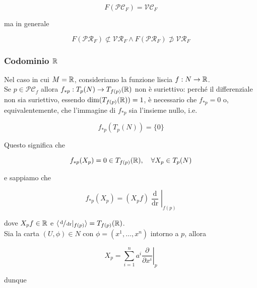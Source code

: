 \begin{remark}
	\begin{equation}
		F(\mathcal{PC}_{F}) = \mathcal{VC}_{F}
	\end{equation}

	ma in generale
	
	\begin{equation}
		F(\mathcal{PR}_{F}) \not\subset \mathcal{VR}_{F} \wedge F(\mathcal{PR}_{F}) \not\supset \mathcal{VR}_{F}
	\end{equation}
\end{remark}

\subsubsection{Codominio $ \mathbb{R} $}

Nel caso in cui $ M = \mathbb{R} $, consideriamo la funzione liscia $ f : N \to \mathbb{R} $.\\
Se $ p \in \mathcal{PC}_{f} $ allora $ f_{*p} : T_{p}(N) \to T_{f(p)}(\mathbb{R}) $ non è suriettivo: perché il differenziale non sia suriettivo, essendo $ \dim(T_{f(p)}(\mathbb{R})) = 1 $, è necessario che $ f_{*p} = 0 $ o, equivalentemente, che l'immagine di $ f_{*p} $ sia l'insieme nullo, i.e.

\begin{equation}
	f_{*p}(T_{p}(N)) = \{0\}
\end{equation}

Questo significa che

\begin{equation}
	f_{*p}(X_{p}) = 0 \in T_{f(p)}(\R) \qcomma \forall X_{p} \in T_{p}(N)
\end{equation}

e sappiamo che

\begin{equation}
	f_{*p}(X_{p}) = (X_{p} f) \left. \dfrac{\operatorname{d}}{\operatorname{dr}} \right|_{f(p)}
\end{equation}

dove $ X_{p} f \in \mathbb{R} $ e $ \langle \sfrac{\operatorname{d}}{\operatorname{dr}} |_{f(p)} \rangle = T_{f(p)}(\mathbb{R}) $.\\
Sia la carta $ (U,\phi) \in N $ con $ \phi = (x^{1},\dots,x^{n}) $ intorno a $ p $, allora

\begin{equation}
	X_{p} = \sum_{i=1}^{n} a^{i} \left. \dfrac{\partial}{\partial x^{i}} \right|_{p}
\end{equation}

dunque

